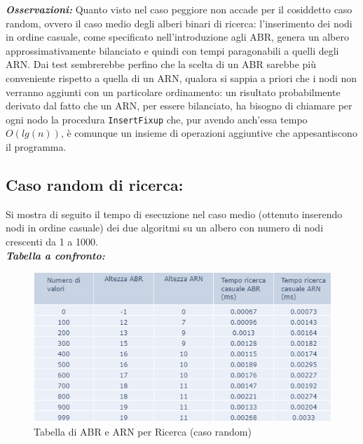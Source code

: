 \documentclass[]{article}
\def\code#1{\texttt{#1}} %
\begin{document}
\noindent \textit{\bf{Osservazioni:}}
Quanto visto nel caso peggiore non accade per il cosiddetto caso random, ovvero il caso medio degli alberi binari di ricerca: l'inserimento dei nodi in ordine casuale, come specificato nell'introduzione agli ABR, genera un albero approssimativamente bilanciato e quindi con tempi paragonabili a quelli degli ARN. Dai test sembrerebbe perfino che la scelta di un ABR sarebbe più conveniente rispetto a quella di un ARN, qualora si sappia a priori che i nodi non verranno aggiunti con un particolare ordinamento: un risultato probabilmente derivato dal fatto che un ARN, per essere bilanciato, ha bisogno di chiamare per ogni nodo la procedura \code{InsertFixup} che, pur avendo anch'essa tempo $O(lg(n))$, è comunque un insieme di operazioni aggiuntive che appesantiscono il programma.

\subsection {Caso random di ricerca:} 
Si mostra di seguito il tempo di esecuzione nel caso medio (ottenuto inserendo nodi in ordine casuale) dei due algoritmi su un albero con numero di nodi crescenti da 1 a 1000. \\

\noindent \textit{\bf{Tabella a confronto:}}
\begin{figure}[ht]
\centering
\includegraphics[]{TabellaRicercaCasuale}
\caption{Tabella di ABR e ARN per Ricerca (caso random)}
\label{fig:fig7}
\end{figure}
\end{document}
